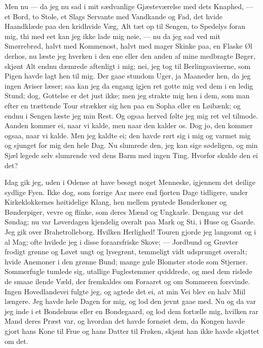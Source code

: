 \documentclass[12pt,a4paper]{book}
\newcommand{\apage}[1]{\marginnote{\footnotesize\textit{[#1]}}}
\begin{document}
Men nu --- da jeg nu sad i mit sædvanlige Gjæsteværelse med dets
Knaphed, --- et Bord, to Stole, et Slags Servante med Vandkande og
Fad, \apage{4}  det hvide Haandklæde paa den kridhvide Væg, Alt tæt op til Sengen,
to Spedelys foran mig, thi med eet kan jeg ikke lade mig nøie, --- nu da
jeg sad ved mit Smørrebrød, halvt med Kommenost, halvt med mager Skinke
paa, en Flaske Øl derhos, nu læste jeg hverken i den ene eller den anden
af mine medbragte Bøger, skjønt Alt endnu dæmrede aftenligt i mig; nei,
jeg tog til Berlingsaviserne, som Pigen havde lagt hen til mig. Der gaae
stundom Uger, ja Maaneder hen, da jeg ingen Aviser læser; saa kan jeg da
engang igjen ret gotte mig ved dem i en ledig Stund; dog, Gottelse er
det just ikke; men jeg strakte mig hen i dem, som man efter en trættende
Tour strækker sig hen paa en Sopha eller en Løibænk; og endnu i Sengen
læste jeg min Rest. Og ogsaa herved følte jeg mig ret vel tilmode.
Aanden kommer ei, naar vi kalde, men naar den kalder os. Dog jo, den
kommer ogsaa, naar vi kalde. Men jeg kaldte ei; den havde rørt sig i mig
og varmet mig og sjunget for mig den hele Dag. Nu slumrede den, jeg kan
sige sødeligen, og min Sjæl legede selv slumrende ved dens Barm med
ingen Ting. Hvorfor skulde den ei det?

Idag gik jeg, uden i Odense at have besøgt noget Menneske, igjennem det
deilige sydlige Fyen. Ikke dog, som forrige Aar mere end
fjorten \apage{5}  Dage tidligere, under Kirkeklokkernes høitidelige Klang, hen
mellem pyntede Bønderkoner og Bønderpiger, vevre og flinke, som deres
Mænd og Ungkarle. Dengang var det Søndag; nu var Løverdagen kjendelig
overalt paa Mark og Sti, i Huse og Gaarde. Jeg gik over Brahetrolleborg.
Hvilken Herlighed! Touren gjorde jeg langsomt og i al Mag; ofte hvilede
jeg i disse foraarsfriske Skove; --- Jordbund og Grøvter frodigt grønne
og Løvet ungt og lysegrønt, temmeligt vidt udsprunget overalt; hvide
Anemoner i den grønne Bund; mange gule Blomster stode som Stjerner.
Sommerfugle tumlede sig, utallige Fuglestemmer qviddrede, og med dem
rislede de smaae ilende Væld, der fremkaldes om Foraaret og om Sommeren
forsvinde. Ingen Hovedlandevei fulgte jeg, og agtede det ei, at min Vei
blev en halv Miil længere. Jeg havde hele Dagen for mig, og lod den
jevnt gaae med. Nu og da var jeg inde i et Bondehuus eller en
Bondegaard, og lod dem fortælle mig, hvilken rar Mand deres Præst var,
og hvordan det havde fornøiet dem, da Kongen havde gjort hans Kone til
Frue og hans Datter til Frøken, skjønt han ikke havde skjøttet om det.
\end{document}
